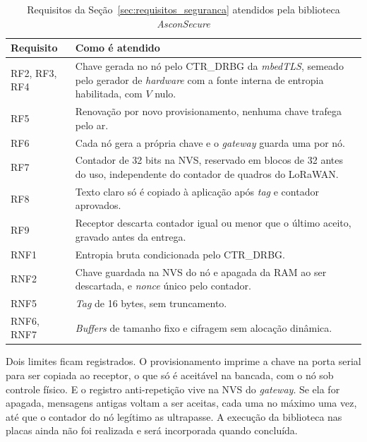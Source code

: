 \begin{table}[htb]
\centering
\caption{Requisitos da Seção~\ref{sec:requisitos_seguranca} atendidos pela biblioteca \textit{AsconSecure}}
\label{tab:asconsecure_requisitos}
\begin{tabular}{lp{10cm}}
\hline
\textbf{Requisito} & \textbf{Como é atendido} \\
\hline
RF2, RF3, RF4 & Chave gerada no nó pelo CTR\_DRBG da \textit{mbedTLS}, semeado pelo gerador de \textit{hardware} com a fonte interna de entropia habilitada, com $V$ nulo. \\
RF5           & Renovação por novo provisionamento, nenhuma chave trafega pelo ar. \\
RF6           & Cada nó gera a própria chave e o \textit{gateway} guarda uma por nó. \\
RF7           & Contador de 32 bits na NVS, reservado em blocos de 32 antes do uso, independente do contador de quadros do LoRaWAN. \\
RF8           & Texto claro só é copiado à aplicação após \textit{tag} e contador aprovados. \\
RF9           & Receptor descarta contador igual ou menor que o último aceito, gravado antes da entrega. \\
RNF1          & Entropia bruta condicionada pelo CTR\_DRBG. \\
RNF2          & Chave guardada na NVS do nó e apagada da RAM ao ser descartada, e \textit{nonce} único pelo contador. \\
RNF5          & \textit{Tag} de 16 bytes, sem truncamento. \\
RNF6, RNF7    & \textit{Buffers} de tamanho fixo e cifragem sem alocação dinâmica. \\
\hline
\end{tabular}
\end{table}

Dois limites ficam registrados. O provisionamento imprime a chave na porta serial para ser copiada ao receptor, o que só é aceitável na bancada, com o nó sob controle físico. E o registro anti-repetição vive na NVS do \textit{gateway}. Se ela for apagada, mensagens antigas voltam a ser aceitas, cada uma no máximo uma vez, até que o contador do nó legítimo as ultrapasse. A execução da biblioteca nas placas ainda não foi realizada e será incorporada quando concluída.


